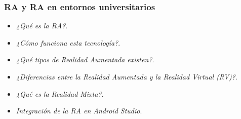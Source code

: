 \begin{frame}
	\frametitle{RA y RA en entornos universitarios}
		\begin{itemize}
			\item {\it ¿Qué es la RA?}.
			\item {\it ¿Cómo funciona esta tecnología?}.
			\item {\it ¿Qué tipos de Realidad Aumentada existen?}.
			\item {\it ¿Diferencias entre la Realidad Aumentada y la Realidad Virtual (RV)?}.
			\item {\it ¿Qué es la Realidad Mixta?}.
			\item {\it Integración de la RA en Android Studio}.
		\end{itemize}
	\endblock{}
\end{frame}

